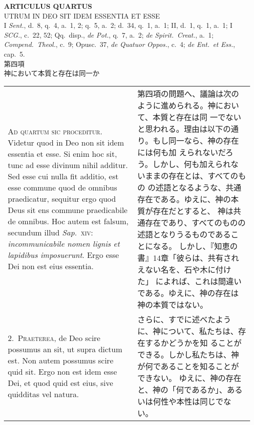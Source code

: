 \documentclass[10pt]{jsarticle}
\begin{document}
\newpage
{}

\begin{center}
 {\Large {\bf ARTICULUS QUARTUS}}\\
 {\large UTRUM IN DEO SIT IDEM ESSENTIA ET ESSE}\\
 {\footnotesize I \textit{Sent.}, d.~8, q.~4, a.~1, 2; q.~5, a.~2;
 d.~34, q.~1, a.~1; II, d.~1, q.~1, a.~1; I \textit{SCG.}, c.~22, 52;
 Qq.~disp., \textit{de Pot.}, q.~7, a.~2; \textit{de Spirit.~Creat.},
 a.~1; \textit{Compend.~Theol.}, c.~9; Opusc.~37, \textit{de Quatuor
 Oppos.}, c.~4; \textit{de Ent.~et Ess.}, cap.~5.}\\
{\Large 第四項\\神において本質と存在は同一か}
\end{center}

\begin{longtable}{p{21em}p{21em}}

{\huge A}\textsc{d quartum sic proceditur}. Videtur quod in Deo non
sit idem essentia et esse.  Si enim hoc sit, tunc ad esse divinum
nihil additur.  Sed esse cui nulla fit additio, est esse commune quod
de omnibus praedicatur, sequitur ergo quod Deus sit ens commune
praedicabile de omnibus.  Hoc autem est falsum, secundum illud
\textit{Sap.}~\textsc{xiv}: \textit{incommunicabile nomen lignis et
lapidibus imposuerunt}.  Ergo esse Dei non est eius essentia.

&


第四項の問題へ、議論は次のように進められる。神において、本質と存在は同
一でないと思われる。理由は以下の通り。もし同一なら、神の存在には何も加
えられないだろう。しかし、何も加えられないままの存在とは、すべてのもの
の述語となるような、共通存在である。ゆえに、神の本質が存在だとすると、
神は共通存在であり、すべてのものの述語となりうるものであることになる。
しかし、『知恵の書』14章「彼らは、共有されえない名を、石や木に付けた」
によれば、これは間違いである。ゆえに、神の存在は神の本質ではない。

\\


2.~\textsc{Praeterea}, de Deo scire possumus an sit, ut supra dictum
est.  Non autem possumus scire quid sit.  Ergo non est idem esse Dei,
et quod quid est eius, sive quidditas vel natura.

&

さらに、すでに述べたように、神について、私たちは、存在するかどうかを知
ることができる。しかし私たちは、神が何であることを知ることができない。
ゆえに、神の存在と、神の「何であるか」、あるいは何性や本性は同じでない。


\end{longtable}
\end{document}
